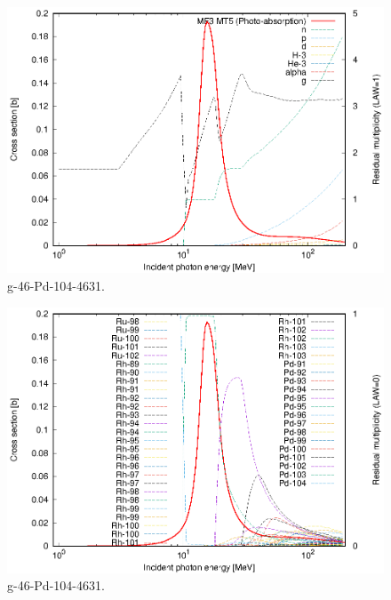 \begin{figure}
 \includegraphics[width=\linewidth]{eps/g_46-Pd-104_4631.eps}
  \caption{g-46-Pd-104-4631.}
\end{figure}
\begin{figure}
 \includegraphics[width=\linewidth]{eps-law0/g_46-Pd-104_4631.eps}
 \caption{g-46-Pd-104-4631.}
\end{figure}
\newpage \clearpage

